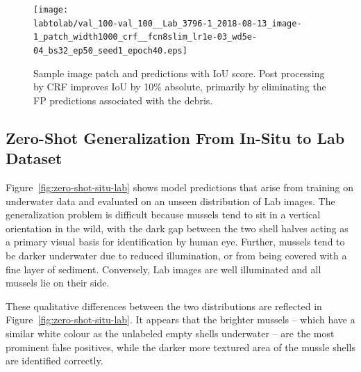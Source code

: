 \documentclass[11pt]{article} %
\begin{document}
\begin{figure}
\centering
\texttt{[image: \\labtolab/val\_100-val\_100\_\_Lab\_3796-1\_2018-08-13\_image-1\_patch\_width1000\_crf\_\_fcn8slim\_lr1e-03\_wd5e-04\_bs32\_ep50\_seed1\_epoch40.eps]}
\caption{Sample image patch and predictions with IoU score. Post processing 
by CRF improves IoU by 10\% absolute, primarily by eliminating the FP
predictions associated with the debris.}
\label{fig:lab-to-lab-sample}
\end{figure}


\subsection{Zero-Shot Generalization From In-Situ to Lab Dataset}

Figure~\ref{fig:zero-shot-situ-lab} shows model predictions that arise from
training on underwater data and evaluated on an unseen distribution of Lab
images. The generalization problem is difficult because mussels tend to sit in a
vertical orientation in the wild, with the dark gap between the two shell
halves acting as a primary visual basis for identification by human eye. 
Further, mussels tend to be darker underwater due to reduced illumination, or
from being covered with a fine layer of sediment. Conversely, Lab images are 
well illuminated and all mussels lie on their side. 

These qualitative differences between the two distributions are 
reflected in Figure~\ref{fig:zero-shot-situ-lab}. It appears that the brighter 
mussels -- which have a similar white colour as the unlabeled empty shells
underwater -- are the most prominent false positives, while the darker more 
textured area of the mussle shells are identified correctly.

\newcommand{\zshot}{./img/situ_to_lab/}
\end{document}
